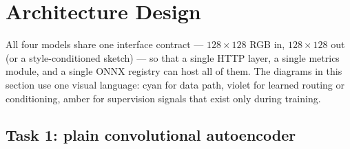 \documentclass[journal]{IEEEtran}
\begin{document}
\section{Architecture Design}
\label{sec:arch}

All four models share one interface contract --- $128\times128$ RGB in, $128\times128$ out (or a style-conditioned sketch) --- so that a single HTTP layer, a single metrics module, and a single ONNX registry can host all of them. The diagrams in this section use one visual language: cyan for data path, violet for learned routing or conditioning, amber for supervision signals that exist only during training.

\subsection{Task 1: plain convolutional autoencoder}
\label{sec:arch1}
\end{document}
